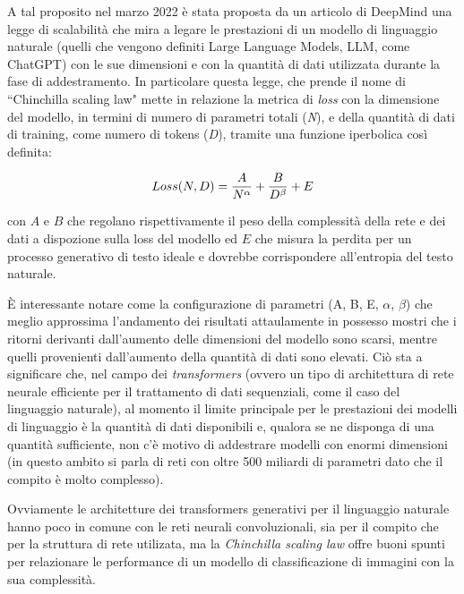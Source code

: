 A tal proposito nel marzo 2022 è stata proposta da un articolo di DeepMind \cite{chinchilla} una legge di scalabilità che mira a legare le prestazioni di un modello di linguaggio naturale (quelli che vengono definiti Large Language Models, LLM, come ChatGPT) con le sue dimensioni e con la quantità di dati utilizzata durante la fase di addestramento.
In particolare questa legge, che prende il nome di ``Chinchilla scaling law" mette in relazione la metrica di \textit{loss} con la dimensione del modello, in termini di numero di parametri totali (\textit{N}), e della quantità di dati di training, come numero di tokens (\textit{D}), tramite una funzione iperbolica così definita:

\begin{equation}
    \centering
    Loss(N,D) = \frac{A}{N^{\alpha}} + \frac{B}{D^{\beta}} + E
\end{equation}

con $A$ e $B$ che regolano rispettivamente il peso della complessità della rete e dei dati a dispozione sulla loss del modello ed $E$ che misura la perdita per un processo generativo di testo ideale e dovrebbe corrispondere all'entropia del testo naturale.

È interessante notare come la configurazione di parametri (A, B, E, $\alpha$, $\beta$) che meglio approssima l'andamento dei risultati attaulamente in possesso mostri che i ritorni derivanti dall'aumento delle dimensioni del modello sono scarsi, mentre quelli provenienti dall'aumento della quantità di dati sono elevati. Ciò sta a significare che, nel campo dei \textit{transformers} (ovvero un tipo di architettura di rete neurale efficiente per il trattamento di dati sequenziali, come il caso del linguaggio naturale),  al momento il limite principale per le prestazioni dei modelli di linguaggio è la quantità di dati disponibili e, qualora se ne disponga di una quantità sufficiente, non c'è motivo di addestrare modelli con enormi dimensioni (in questo ambito si parla di reti con oltre 500 miliardi di parametri dato che il compito è molto complesso).

Ovviamente le architetture dei transformers generativi per il linguaggio naturale hanno poco in comune con le reti neurali convoluzionali, sia per il compito che per la struttura di rete utilizata, ma la \textit{Chinchilla scaling law} offre buoni spunti per relazionare le performance di un modello di classificazione di immagini con la sua complessità.






